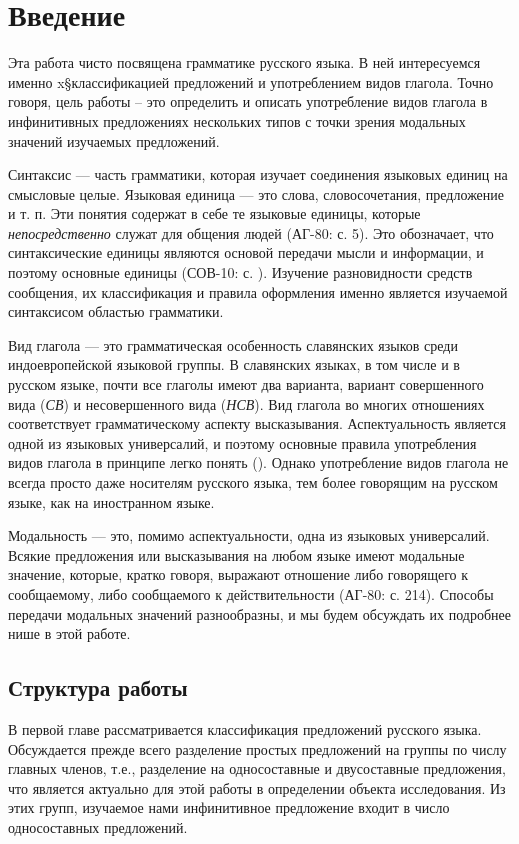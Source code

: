 \section{Введение}

Эта работа чисто посвящена грамматике русского языка. В ней интересуемся именно x§классификацией предложений и употреблением видов глагола. Точно говоря, цель работы -- это определить и описать употребление видов глагола в инфинитивных предложениях нескольких типов с точки зрения модальных значений изучаемых предложений.

Синтаксис --- часть грамматики, которая изучает соединения языковых единиц на смысловые целые. Языковая единица --- это слова, словосочетания, предложение и т. п. Эти понятия содержат в себе те языковые единицы, которые \textit{непосредственно} служат для общения людей (АГ-80: с. 5). Это обозначает, что синтаксические единицы являются основой передачи мысли и информации, и поэтому основные единицы (СОВ-10: с. ). Изучение разновидности средств сообщения, их классификация и правила оформления именно является изучаемой синтаксисом областью грамматики.

Вид глагола --- это грамматическая особенность славянских языков среди индоевропейской языковой группы. В славянских языках, в том числе и в русском языке, почти все глаголы имеют два варианта, вариант совершенного вида (\textit{СВ}) и несовершенного вида (\textit{НСВ}). Вид глагола во многих отношениях соответствует грамматическому аспекту высказывания. Аспектуальность является одной из языковых универсалий, и поэтому основные правила употребления видов глагола в принципе легко понять (). Однако употребление видов глагола не всегда просто даже носителям русского языка, тем более говорящим на русском языке, как на иностранном языке.

Модальность --- это, помимо аспектуальности, одна из языковых универсалий. Всякие предложения или высказывания на любом языке имеют модальные значение, которые, кратко говоря, выражают отношение либо говорящего к сообщаемому, либо сообщаемого к действительности (АГ-80: с. 214). Способы передачи модальных значений разнообразны, и мы будем обсуждать их подробнее нише в этой работе.

\subsection{Структура работы}

В первой главе рассматривается классификация предложений русского языка. Обсуждается прежде всего разделение простых предложений на группы по числу главных членов, т.е., разделение на односоставные и двусоставные предложения, что является актуально для этой работы в определении объекта исследования. Из этих групп, изучаемое нами инфинитивное предложение входит в число односоставных предложений.

